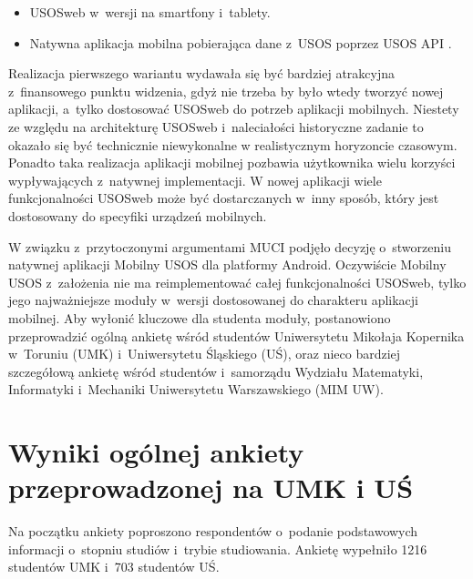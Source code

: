 \documentclass{pracamgr}
\begin{document}
\begin{itemize}
	\item USOSweb w~wersji na smartfony i~tablety.
	\item Natywna aplikacja mobilna pobierająca dane z~USOS poprzez USOS API \cite{usosapi}.
\end{itemize}

Realizacja pierwszego wariantu wydawała się być bardziej atrakcyjna z~finansowego
punktu widzenia, gdyż nie trzeba by było wtedy tworzyć nowej aplikacji, a~tylko
dostosować USOSweb do potrzeb aplikacji mobilnych. Niestety ze względu na architekturę
USOSweb i~naleciałości historyczne zadanie to okazało się być technicznie niewykonalne
w realistycznym horyzoncie czasowym. Ponadto taka realizacja aplikacji mobilnej
pozbawia użytkownika wielu korzyści wypływających z~natywnej implementacji.
W nowej aplikacji wiele funkcjonalności USOSweb może być dostarczanych w~inny
sposób, który jest dostosowany do specyfiki urządzeń mobilnych.

W związku z~przytoczonymi argumentami MUCI podjęło decyzję o~stworzeniu natywnej
aplikacji Mobilny USOS dla platformy Android. Oczywiście Mobilny USOS z~założenia
nie ma reimplementować całej funkcjonalności USOSweb, tylko jego najważniejsze
moduły w~wersji dostosowanej do charakteru aplikacji mobilnej.
Aby wyłonić kluczowe dla studenta moduły, postanowiono przeprowadzić
ogólną ankietę wśród studentów Uniwersytetu Mikołaja Kopernika w~Toruniu (UMK) i~Uniwersytetu
Śląskiego (UŚ), oraz nieco bardziej szczegółową ankietę wśród studentów i~samorządu
Wydziału Matematyki, Informatyki i~Mechaniki Uniwersytetu Warszawskiego (MIM UW).

\section{Wyniki ogólnej ankiety przeprowadzonej na UMK i UŚ}

Na początku ankiety poproszono respondentów o~podanie podstawowych informacji o~stopniu studiów i~trybie studiowania. Ankietę wypełniło 1216 studentów UMK i~703 studentów UŚ.
\end{document}
